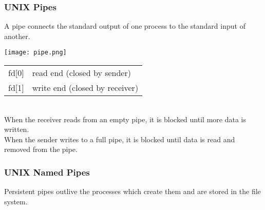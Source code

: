 \documentclass{report}
\begin{document}
\subsubsection*{UNIX Pipes}
A pipe connects the standard output of one process to the standard input of another.
\begin{center}
	\texttt{[image: pipe.png]}
\end{center}

\begin{tabular}{r l}
	fd[0] & read end (closed by sender)    \\
	fd[1] & write end (closed by receiver) \\
\end{tabular}
\\ When the receiver reads from an empty pipe, it is blocked until more data is written.
\\ When the sender writes to a full pipe, it is blocked until data is read and removed from the pipe.


\subsubsection*{UNIX Named Pipes}
Persistent pipes outlive the processes which create them and are stored in the file system.

\end{document}
